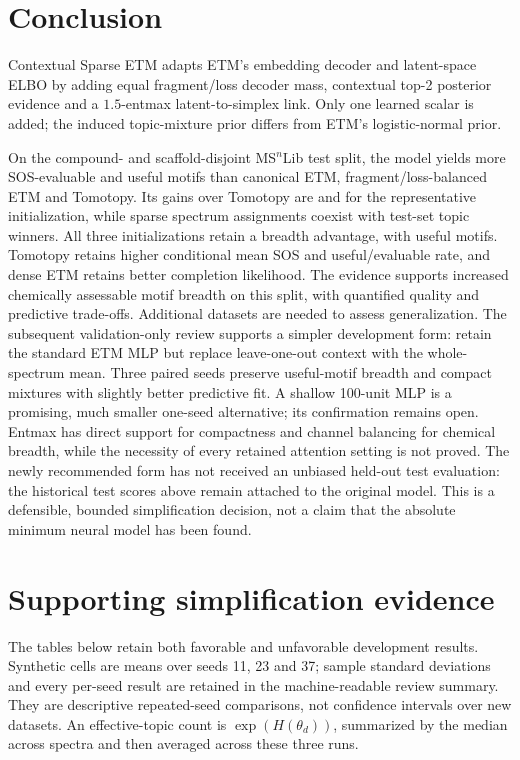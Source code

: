 \documentclass[10pt,a4paper]{article}
\begin{document}
\section{Conclusion}

Contextual Sparse ETM adapts ETM's embedding decoder and latent-space ELBO by
adding equal fragment/loss decoder mass, contextual top-2 posterior evidence
and a $1.5$-entmax latent-to-simplex link. Only one learned scalar is added;
the induced topic-mixture prior differs from ETM's logistic-normal prior.

On the compound- and scaffold-disjoint MS$^{n}$Lib test split, the model yields
more SOS-evaluable and useful motifs than canonical ETM,
fragment/loss-balanced ETM and Tomotopy. Its gains over Tomotopy are
\ContextualEvaluableGainVsTomotopy{} and
\ContextualUsefulGainVsTomotopy{} for the representative initialization, while sparse
spectrum assignments coexist with \UniqueTopOneTopics{} test-set topic winners.
All three initializations retain a breadth advantage, with
\StabilityUsefulRange{} useful motifs.
Tomotopy retains higher conditional mean SOS and useful/evaluable rate, and
dense ETM retains better completion likelihood. The evidence supports increased
chemically assessable motif breadth on this split, with quantified quality and
predictive trade-offs. Additional datasets are needed to assess generalization.
The subsequent validation-only review supports a simpler development form:
retain the standard ETM MLP but replace leave-one-out context with the
whole-spectrum mean. Three paired seeds preserve useful-motif breadth and
compact mixtures with slightly better predictive fit. A shallow 100-unit
MLP is a promising, much smaller one-seed alternative; its confirmation remains
open. Entmax has direct support for compactness and channel balancing for
chemical breadth, while the necessity of every retained attention setting is
not proved. The newly recommended form has not received an unbiased held-out
test evaluation: the historical test scores above remain attached to the
original model. This is a defensible, bounded simplification decision, not a
claim that the absolute minimum neural model has been found.

\clearpage
\appendix

\section{Supporting simplification evidence}

The tables below retain both favorable and unfavorable development results.
Synthetic cells are means over seeds 11, 23 and 37; sample standard deviations
and every per-seed result are retained in the machine-readable review summary.
They are descriptive repeated-seed comparisons, not confidence intervals over
new datasets. An effective-topic count is $\exp(H(\theta_d))$, summarized by the
median across spectra and then averaged across these three runs.
\end{document}
